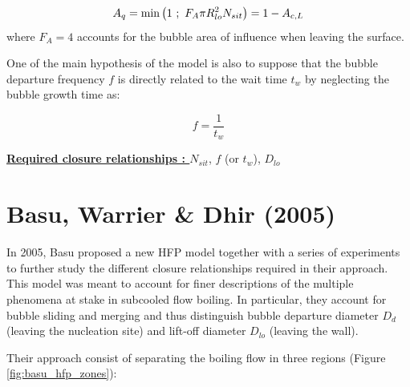 \begin{align}
A_{q}=\mathrm{min}\left( 1\ ;\ F_{A}\pi R_{lo}^{2} N_{sit} \right)=1-A_{c,L}
\label{eq:KP_hfp_Aq}
\end{align}
where $F_{A}=4$ accounts for the bubble area of influence when leaving the surface.

\npar

One of the main hypothesis of the model is also to suppose that the bubble departure frequency $f$ is directly related to the wait time $t_{w}$ by neglecting the bubble growth time as:

\begin{equation}
f = \frac{1}{t_{w}}
\end{equation}

\textbf{\underline{Required closure relationships : }} $N_{sit}$, $f$ (or $t_{w}$), $D_{lo}$ 


\section{Basu, Warrier \& Dhir (2005)}
\label{sec:hfp_basu}

In 2005, Basu \etal \cite{basu_wall_2005, basu_wall_2005-1} proposed a new HFP model together with a series of experiments to further study the different closure relationships required in their approach. This model was meant to account for finer descriptions of the multiple phenomena at stake in subcooled flow boiling. In particular, they account for bubble sliding and merging and thus distinguish bubble departure diameter $D_{d}$ (leaving the nucleation site) and lift-off diameter $D_{lo}$ (leaving the wall).

\npar
Their approach consist of separating the boiling flow in three regions (Figure \ref{fig:basu_hfp_zones}):

